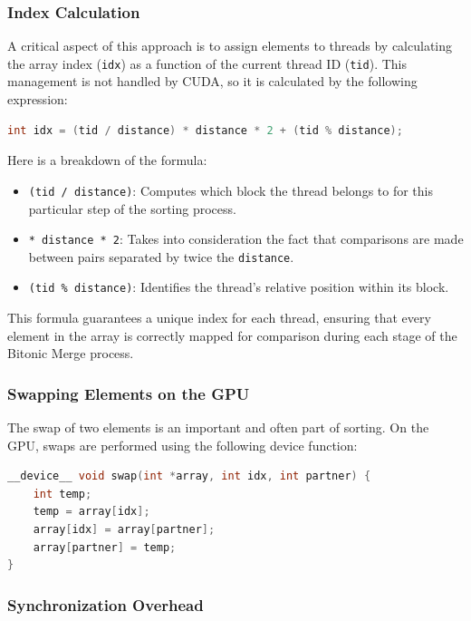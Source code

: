 \documentclass[a4paper,12pt]{article}
\begin{document}
\subsubsection*{Index Calculation}

A critical aspect of this approach is to assign elements to threads by calculating the array index (\texttt{idx}) as a function of the current thread ID (\texttt{tid}). This management is not handled by CUDA, so it is calculated by the following expression:
\\
\begin{lstlisting}[language=C]
int idx = (tid / distance) * distance * 2 + (tid % distance);
\end{lstlisting}
\newpage
Here is a breakdown of the formula:
\begin{itemize}
    \item \texttt{(tid / distance)}: Computes which block the thread belongs to for this particular step of the sorting process.
    \item \texttt{* distance * 2}: Takes into consideration the fact that comparisons are made between pairs separated by twice the \texttt{distance}.
    \item \texttt{(tid \% distance)}: Identifies the thread’s relative position within its block.
\end{itemize}

This formula guarantees a unique index for each thread, ensuring that every element in the array is correctly mapped for comparison during each stage of the Bitonic Merge process.

\subsubsection*{Swapping Elements on the GPU}

The swap of two elements is an important and often part of sorting. On the GPU, swaps are performed using the following device function:
\\
\begin{lstlisting}[language=C]
__device__ void swap(int *array, int idx, int partner) {
    int temp;
    temp = array[idx];
    array[idx] = array[partner];
    array[partner] = temp;
}
\end{lstlisting}


\subsubsection*{Synchronization Overhead}
\end{document}
